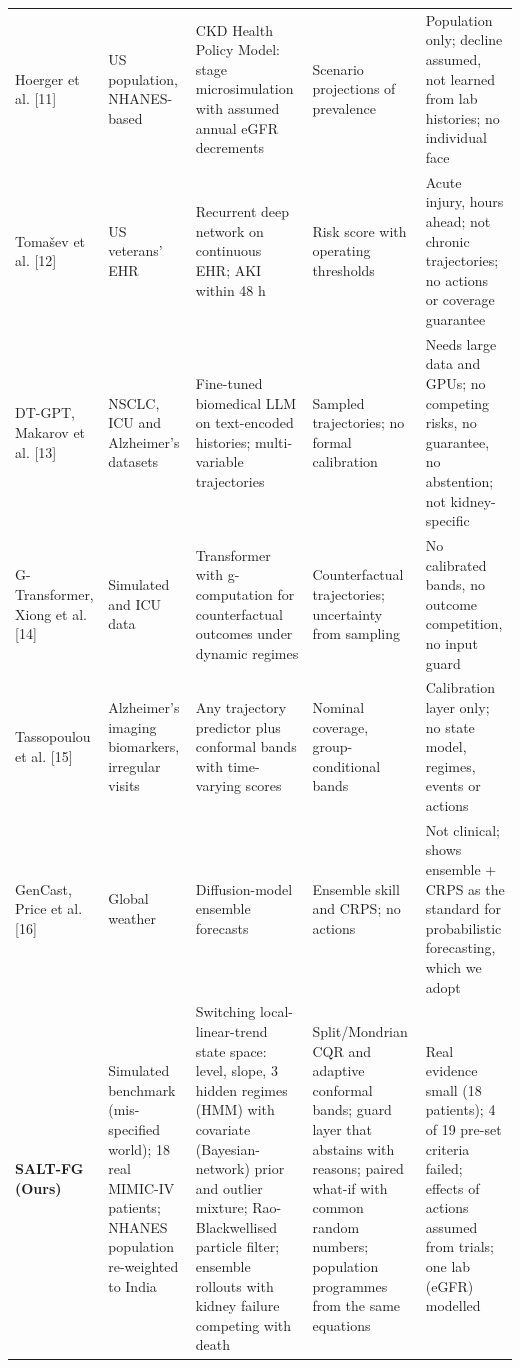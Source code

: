 \begin{table}[t]
\begin{tabular}{@{}p{}p{}p{}p{}p{}@{}}
Hoerger et al. [11] & US population, NHANES-based & CKD Health Policy Model: stage microsimulation with assumed annual eGFR decrements & Scenario projections of prevalence & Population only; decline assumed, not learned from lab histories; no individual face \\
Toma\v{s}ev et al. [12] & US veterans' EHR & Recurrent deep network on continuous EHR; AKI within 48 h & Risk score with operating thresholds & Acute injury, hours ahead; not chronic trajectories; no actions or coverage guarantee \\
DT-GPT, Makarov et al. [13] & NSCLC, ICU and Alzheimer's datasets & Fine-tuned biomedical LLM on text-encoded histories; multi-variable trajectories & Sampled trajectories; no formal calibration & Needs large data and GPUs; no competing risks, no guarantee, no abstention; not kidney-specific \\
G-Transformer, Xiong et al. [14] & Simulated and ICU data & Transformer with g-computation for counterfactual outcomes under dynamic regimes & Counterfactual trajectories; uncertainty from sampling & No calibrated bands, no outcome competition, no input guard \\
Tassopoulou et al. [15] & Alzheimer's imaging biomarkers, irregular visits & Any trajectory predictor plus conformal bands with time-varying scores & Nominal coverage, group-conditional bands & Calibration layer only; no state model, regimes, events or actions \\
GenCast, Price et al. [16] & Global weather & Diffusion-model ensemble forecasts & Ensemble skill and CRPS; no actions & Not clinical; shows ensemble + CRPS as the standard for probabilistic forecasting, which we adopt \\
\midrule
\textbf{SALT-FG (Ours)} & Simulated benchmark (mis-specified world); 18 real MIMIC-IV patients; NHANES population re-weighted to India & Switching local-linear-trend state space: level, slope, 3 hidden regimes (HMM) with covariate (Bayesian-network) prior and outlier mixture; Rao-Blackwellised particle filter; ensemble rollouts with kidney failure competing with death & Split/Mondrian CQR and adaptive conformal bands; guard layer that abstains with reasons; paired what-if with common random numbers; population programmes from the same equations & Real evidence small (18 patients); 4 of 19 pre-set criteria failed; effects of actions assumed from trials; one lab (eGFR) modelled \\
\bottomrule
\end{tabular}
\end{table}
